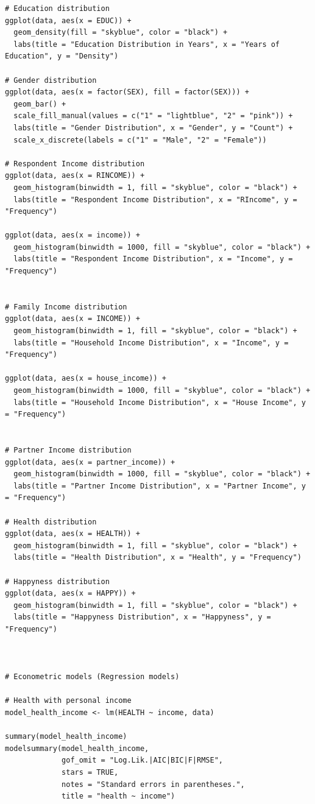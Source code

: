 \documentclass{article}[13pt]
\begin{document}
\begin{verbatim}
# Education distribution
ggplot(data, aes(x = EDUC)) +
  geom_density(fill = "skyblue", color = "black") +
  labs(title = "Education Distribution in Years", x = "Years of Education", y = "Density")

# Gender distribution
ggplot(data, aes(x = factor(SEX), fill = factor(SEX))) +
  geom_bar() +
  scale_fill_manual(values = c("1" = "lightblue", "2" = "pink")) +
  labs(title = "Gender Distribution", x = "Gender", y = "Count") +
  scale_x_discrete(labels = c("1" = "Male", "2" = "Female"))

# Respondent Income distribution
ggplot(data, aes(x = RINCOME)) +
  geom_histogram(binwidth = 1, fill = "skyblue", color = "black") +
  labs(title = "Respondent Income Distribution", x = "RIncome", y = "Frequency")

ggplot(data, aes(x = income)) +
  geom_histogram(binwidth = 1000, fill = "skyblue", color = "black") +
  labs(title = "Respondent Income Distribution", x = "Income", y = "Frequency")


# Family Income distribution
ggplot(data, aes(x = INCOME)) +
  geom_histogram(binwidth = 1, fill = "skyblue", color = "black") +
  labs(title = "Household Income Distribution", x = "Income", y = "Frequency")

ggplot(data, aes(x = house_income)) +
  geom_histogram(binwidth = 1000, fill = "skyblue", color = "black") +
  labs(title = "Household Income Distribution", x = "House Income", y = "Frequency")


# Partner Income distribution
ggplot(data, aes(x = partner_income)) +
  geom_histogram(binwidth = 1000, fill = "skyblue", color = "black") +
  labs(title = "Partner Income Distribution", x = "Partner Income", y = "Frequency")

# Health distribution
ggplot(data, aes(x = HEALTH)) +
  geom_histogram(binwidth = 1, fill = "skyblue", color = "black") +
  labs(title = "Health Distribution", x = "Health", y = "Frequency")

# Happyness distribution
ggplot(data, aes(x = HAPPY)) +
  geom_histogram(binwidth = 1, fill = "skyblue", color = "black") +
  labs(title = "Happyness Distribution", x = "Happyness", y = "Frequency")



# Econometric models (Regression models)

# Health with personal income
model_health_income <- lm(HEALTH ~ income, data)

summary(model_health_income)
modelsummary(model_health_income,
             gof_omit = "Log.Lik.|AIC|BIC|F|RMSE",
             stars = TRUE,
             notes = "Standard errors in parentheses.",
             title = "health ~ income")


\end{verbatim}
\end{document}
